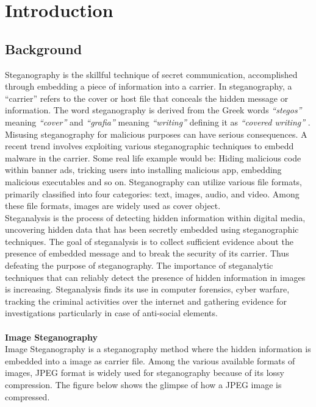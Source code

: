 \chapter{Introduction}
\section{Background}  
\sloppy
Steganography is the skillful technique of secret communication, accomplished through embedding a piece of information into a carrier. In steganography, a ``carrier'' refers to the cover or host file that conceals the hidden message or information. The word steganography is derived from the Greek words \textit{“stegos”} meaning \textit{“cover”} and \textit{“grafia”} meaning \textit{“writing”} defining it as \textit{“covered writing”} \cite{14}. Misusing steganography for malicious purposes can have serious consequences. A recent trend involves exploiting various steganographic techniques to embedd malware in the carrier. Some real life example would be: Hiding malicious code within banner ads, tricking users into installing malicious app, embedding malicious executables and so on. Steganography can utilize various file formats, primarily classified into four categories: text, images, audio, and video. Among these file formats, images are widely used as cover object.\\
Steganalysis is the process of detecting hidden information within digital media, uncovering hidden data that has been secretly embedded using steganographic techniques. The goal of steganalysis is to collect sufficient evidence about the presence of embedded message and to break the security of its carrier. Thus defeating the purpose of steganography. The importance of steganalytic techniques that can reliably detect the presence of hidden information in images is increasing. Steganalysis finds its use in computer forensics, cyber warfare, tracking the criminal activities over the internet and gathering evidence for investigations particularly in case of anti-social elements.\cite{20} \\ \\
\textbf{Image Steganography}\\
Image Steganography is a steganography method where the hidden information is embedded into a image as carrier file. Among the various available formats of images, JPEG format is widely used for steganography because of its lossy compression. The figure below shows the glimpse of how a JPEG image is compressed.\\
